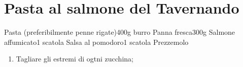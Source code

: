 \section{Pasta al salmone del Tavernando}

\generalRecipeInfos{}

\ingredienti%
    {Pasta (preferibilmente penne rigate)}{400g}%
    {burro}{\qb{}}%
    {Panna fresca}{300g}%
    {Salmone affumicato}{1 scatola}%
    {Salsa al pomodoro}{1 scatola}%
    {Prezzemolo}{\qb{}}%

\begin{enumerate}
    \item Tagliare gli estremi di ogtni zucchina;
    
\end{enumerate}

